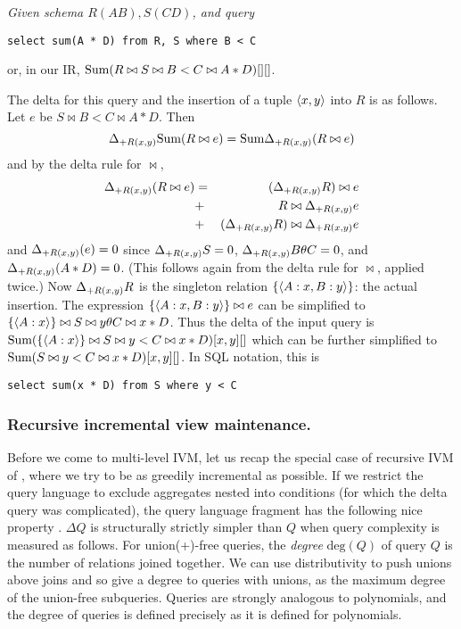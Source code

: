 \begin{example}\em
\label{ex:RS}
Given schema $R(AB), S(CD)$, and query
\begin{verbatim}
select sum(A * D) from R, S where B < C
\end{verbatim}
or, in our IR,
$\mbox{Sum}(R \bowtie S \bowtie B < C \bowtie A*D)[][]$.

The delta for this query and the insertion of a tuple ${\langle x,y\rangle}$ into $R$ is as follows.
Let $e$ be $S \bowtie B < C \bowtie A*D$.
Then
\[
\Delta_{+R(x,y)} \mbox{Sum}(R \bowtie e) = \mbox{Sum} \Delta_{+R(x,y)} (R \bowtie e)
\]
and by the delta rule for $\bowtie$,
\begin{eqnarray*}
\Delta_{+R(x,y)} (R \bowtie e) &=& (\Delta_{+R(x,y)} R) \bowtie e \\
&+& R \bowtie \Delta_{+R(x,y)} e \\
&+& (\Delta_{+R(x,y)} R) \bowtie \Delta_{+R(x,y)} e
\end{eqnarray*}
%
and
$\Delta_{+R(x,y)}(e) = 0$
since
$\Delta_{+R(x,y)} S = 0$, $\Delta_{+R(x,y)} B \theta C = 0$, and $\Delta_{+R(x,y)} (A * D) = 0$. (This follows again from the delta rule for $\bowtie$, applied
twice.)
Now
$\Delta_{+R(x,y)} R$ is the singleton relation $\{{\langle A:x,B:y\rangle}\}$: the actual insertion.
The expression $\{{\langle A:x,B:y\rangle}\} \bowtie e$ can be simplified to
$\{{\langle A:x\rangle}\} \bowtie S \bowtie y \theta C \bowtie x * D$.
%
Thus the delta of the input query is
$\mbox{Sum}(\{{\langle A:x\rangle}\} \bowtie  S \bowtie y < C \bowtie x*D)[x,y][]$ which can be further simplified to
$\mbox{Sum}(S \bowtie y < C \bowtie x*D)[x,y][]$.
In SQL notation, this is
\begin{verbatim}
select sum(x * D) from S where y < C
\end{verbatim}
\end{example}




\subsubsection{Recursive incremental view maintenance.}

\def\deg{\mbox{deg}}

Before we come to multi-level IVM, let us recap the special case of recursive IVM of \cite{koch-pods:10, kennedy-ahmad-koch-cidr:11}, where we try to be as greedily incremental as possible.
If we restrict the query language to exclude aggregates nested into conditions (for which the delta query was complicated), the query language fragment has the following nice property \cite{koch-pods:10}.
%
$\Delta Q$ is structurally strictly simpler than $Q$ when query complexity is measured as follows. 
For union(+)-free queries, the {\em degree} $\deg(Q)$ of query $Q$ is the number of relations joined together. We can use distributivity to push unions above joins and so give a degree to queries with unions, as the maximum degree of the union-free subqueries. Queries are
strongly analogous to polynomials, and the degree of queries is defined precisely as it is defined for
polynomials.


